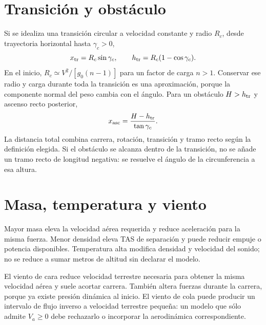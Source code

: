 \section{Transición y obstáculo}
Si se idealiza una transición circular a velocidad constante y radio $R_c$, desde trayectoria horizontal hasta $\gamma_c>0$,
\begin{equation}
x_{\rm tr}=R_c\sin\gamma_c,\qquad
h_{\rm tr}=R_c(1-\cos\gamma_c).
\end{equation}
En el inicio, $R_c\simeq V^2/[g_0(n-1)]$ para un factor de carga $n>1$. Conservar ese radio y carga durante toda la transición es una aproximación, porque la componente normal del peso cambia con el ángulo. Para un obstáculo $H>h_{\rm tr}$ y ascenso recto posterior,
\begin{equation}
x_{\rm asc}=\frac{H-h_{\rm tr}}{\tan\gamma_c}.
\end{equation}
La distancia total combina carrera, rotación, transición y tramo recto según la definición elegida. Si el obstáculo se alcanza dentro de la transición, no se añade un tramo recto de longitud negativa: se resuelve el ángulo de la circunferencia a esa altura.

\section{Masa, temperatura y viento}
Mayor masa eleva la velocidad aérea requerida y reduce aceleración para la misma fuerza. Menor densidad eleva TAS de separación y puede reducir empuje o potencia disponibles. Temperatura alta modifica densidad y velocidad del sonido; no se reduce a sumar metros de altitud sin declarar el modelo.

El viento de cara reduce velocidad terrestre necesaria para obtener la misma velocidad aérea y suele acortar carrera. También altera fuerzas durante la carrera, porque ya existe presión dinámica al inicio. El viento de cola puede producir un intervalo de flujo inverso a velocidad terrestre pequeña: un modelo que sólo admite $V_a\geq0$ debe rechazarlo o incorporar la aerodinámica correspondiente.



